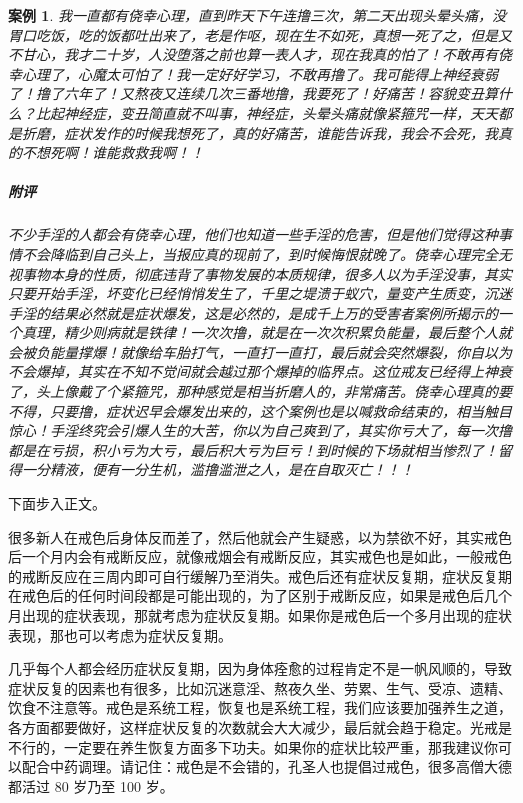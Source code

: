 \documentclass{ctexart}
\newtheorem{case}{案例}
\begin{document}
\begin{case}
    我一直都有侥幸心理，直到昨天下午连撸三次，第二天出现头晕头痛，没胃口吃饭，吃的饭都吐出来了，老是作呕，现在生不如死，真想一死了之，但是又不甘心，我才二十岁，人没堕落之前也算一表人才，现在我真的怕了！不敢再有侥幸心理了，心魔太可怕了！我一定好好学习，不敢再撸了。我可能得上神经衰弱了！撸了六年了！又熬夜又连续几次三番地撸，我要死了！好痛苦！容貌变丑算什么？比起神经症，变丑简直就不叫事，神经症，头晕头痛就像紧箍咒一样，天天都是折磨，症状发作的时候我想死了，真的好痛苦，谁能告诉我，我会不会死，我真的不想死啊！谁能救救我啊！！

    \subparagraph{附评} 不少手淫的人都会有侥幸心理，他们也知道一些手淫的危害，但是他们觉得这种事情不会降临到自己头上，当报应真的现前了，到时候悔恨就晚了。侥幸心理完全无视事物本身的性质，彻底违背了事物发展的本质规律，很多人以为手淫没事，其实只要开始手淫，坏变化已经悄悄发生了，千里之堤溃于蚁穴，量变产生质变，沉迷手淫的结果必然就是症状爆发，这是必然的，是成千上万的受害者案例所揭示的一个真理，精少则病就是铁律！一次次撸，就是在一次次积累负能量，最后整个人就会被负能量撑爆！就像给车胎打气，一直打一直打，最后就会突然爆裂，你自以为不会爆掉，其实在不知不觉间就会越过那个爆掉的临界点。这位戒友已经得上神衰了，头上像戴了个紧箍咒，那种感觉是相当折磨人的，非常痛苦。侥幸心理真的要不得，只要撸，症状迟早会爆发出来的，这个案例也是以喊救命结束的，相当触目惊心！手淫终究会引爆人生的大苦，你以为自己爽到了，其实你亏大了，每一次撸都是在亏损，积小亏为大亏，最后积大亏为巨亏！到时候的下场就相当惨烈了！留得一分精液，便有一分生机，滥撸滥泄之人，是在自取灭亡！！！
\end{case}

下面步入正文。

很多新人在戒色后身体反而差了，然后他就会产生疑惑，以为禁欲不好，其实戒色后一个月内会有戒断反应，就像戒烟会有戒断反应，其实戒色也是如此，一般戒色的戒断反应在三周内即可自行缓解乃至消失。戒色后还有症状反复期，症状反复期在戒色后的任何时间段都是可能出现的，为了区别于戒断反应，如果是戒色后几个月出现的症状表现，那就考虑为症状反复期。如果你是戒色后一个多月出现的症状表现，那也可以考虑为症状反复期。

几乎每个人都会经历症状反复期，因为身体痊愈的过程肯定不是一帆风顺的，导致症状反复的因素也有很多，比如沉迷意淫、熬夜久坐、劳累、生气、受凉、遗精、饮食不注意等。戒色是系统工程，恢复也是系统工程，我们应该要加强养生之道，各方面都要做好，这样症状反复的次数就会大大减少，最后就会趋于稳定。光戒是不行的，一定要在养生恢复方面多下功夫。如果你的症状比较严重，那我建议你可以配合中药调理。请记住：戒色是不会错的，孔圣人也提倡过戒色，很多高僧大德都活过 80 岁乃至 100 岁。
\end{document}
